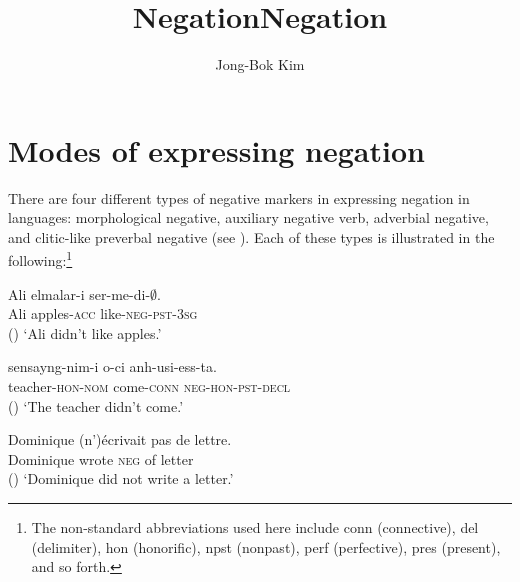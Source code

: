 \documentclass[output=paper
                ,modfonts
                ,nonflat
	        ,collection
	        ,collectionchapter
	        ,collectiontoclongg
 	        ,biblatex
                ,babelshorthands
                ,newtxmath
                ,draftmode
                ,colorlinks, citecolor=brown
]{./langsci/langscibook}
\author{Jong-Bok Kim\affiliation{Kyung Hee University, Seoul}}
\title{Negation}
\title{Negation}
\begin{document}
\maketitle
\label{chap-negation}

{

\section{Modes of expressing negation}


There are four different types of negative markers
in expressing negation in languages: morphological negative,
auxiliary negative verb, adverbial negative, and clitic-like
 preverbal negative (see \citealt{Dahl:79, Payne:85, Dryer:05}).\addpages
Each of these types is illustrated in the following:\footnote{The non-standard abbreviations
used here include 
 {\sc conn} (connective), 
 {\sc del} (delimiter), {\sc hon} (honorific), 
{\sc npst} (nonpast),  {\sc perf} (perfective), {\sc pres} (present), and so forth.}

\eal
\ex\label{negation-1a}
\gll Ali  elmalar-i  ser-me-di-$\emptyset$. \\
Ali apples-\textsc{acc}  like-\textsc{neg}-\textsc{pst}-\textsc{3sg} \\ \hfill ()
\glt `Ali didn't like apples.'

\ex\label{negation-1b}
\gll sensayng-nim-i o-ci anh-usi-ess-ta. \\
teacher-\textsc{hon}-\textsc{nom} come-\textsc{conn} \textsc{neg}-\textsc{hon}-\textsc{pst}-\textsc{decl} \\  \hfill ()
\glt `The teacher didn't come.'

\ex \label{negation-1c}
\gll Dominique (n')\'{e}crivait pas de lettre.\\
     Dominique wrote \textsc{neg} of letter \\ \hfill ()
\glt `Dominique did not write a letter.'

}
\end{document}
